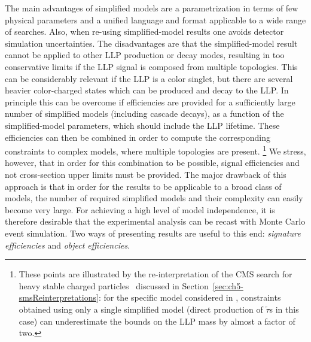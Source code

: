 The main advantages of simplified models are a parametrization in terms of few
physical parameters and a unified language and format applicable to a wide range of searches.
Also, when re-using simplified-model results one avoids detector simulation uncertainties. 
The disadvantages are that the simplified-model result  
cannot be applied to other LLP production or decay modes, resulting
in too conservative limits if the LLP signal is composed from
multiple topologies. This can be considerably relevant if 
the LLP is a color singlet, but there are several heavier color-charged states
which can be produced and decay to the LLP.
In principle this can be overcome if efficiencies are provided for a
sufficiently large number of simplified models (including cascade decays), as a
function of the simplified-model parameters, which should include the LLP lifetime.
These efficiencies can then be combined in order to compute the corresponding
constraints to complex models, where multiple topologies are present.
\footnote{These points are illustrated by the re-interpretation of the CMS search
for heavy stable charged particles~\cite{Khachatryan:2015lla}
discussed in Section~\ref{sec:ch5-smsReinterpretations}: 
for the specific model considered in \cite{Heisig:2015yla},
constraints obtained using only a single simplified model (direct production of
$\tilde{\tau}$s in this case) can underestimate the bounds on the LLP mass by almost a factor of two.}
We stress, however, that in order for this combination to be possible, signal efficiencies and 
not cross-section upper limits must be provided.
The major drawback of this approach is that in order for the results to be
applicable to a broad class of models, the number of required simplified models
and their complexity can easily become very large.
For achieving a high level of model independence, it is therefore desirable 
that the experimental analysis can be recast with Monte Carlo event simulation. 
Two ways of presenting results are useful to this end: {\it signature
efficiencies} and {\it object efficiencies}. 



